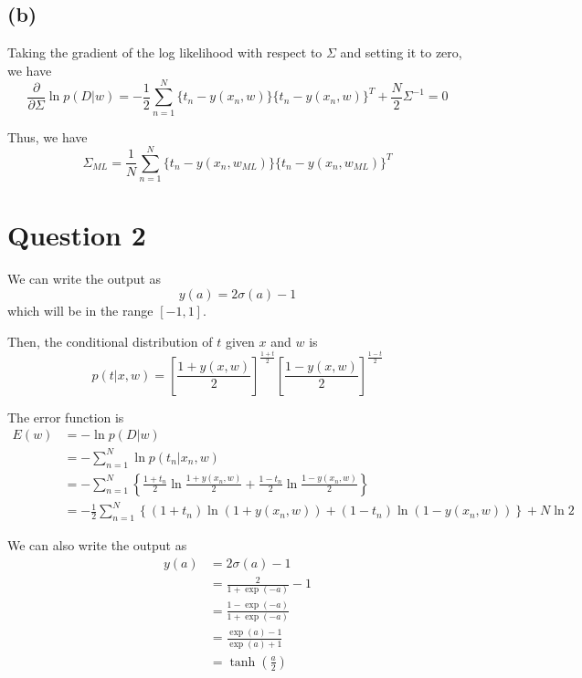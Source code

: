 \documentclass[a4paper,12pt]{article}
\newcommand{\pard}[2]{\frac{\partial #1}{\partial #2}}
\begin{document}
\subsection*{(b)}

Taking the gradient of the log likelihood with respect to $\Sigma$ and setting it to zero, we have
\begin{equation*}
	\pard{}{\Sigma} \ln p(D|w) = -\frac{1}{2} \sum_{n=1}^{N} \{t_n - y(x_n,w)\} \{t_n - y(x_n,w)\}^T + \frac{N}{2} \Sigma^{-1} = 0
\end{equation*}

Thus, we have
\begin{equation*}
	\Sigma_{ML} = \frac{1}{N} \sum_{n=1}^{N} \{t_n - y(x_n,w_{ML})\} \{t_n - y(x_n,w_{ML})\}^T
\end{equation*}

\section*{Question 2}

We can write the output as
\begin{equation*}
	y(a) = 2\sigma(a) - 1
\end{equation*}
which will be in the range $[-1,1]$.

Then, the conditional distribution of $t$ given $x$ and $w$ is
\begin{equation*}
	p(t|x,w) = [\frac{1 + y(x,w)}{2}]^{\frac{1 + t}{2}} [\frac{1 - y(x,w)}{2}]^{\frac{1 - t}{2}}
\end{equation*}

The error function is
\begin{align*}
	E(w) &= -\ln p(D|w) \\
	&= -\sum_{n=1}^{N} \ln p(t_n|x_n,w) \\
	&= -\sum_{n=1}^{N} \left\{ \frac{1 + t_n}{2} \ln \frac{1 + y(x_n,w)}{2} + \frac{1 - t_n}{2} \ln \frac{1 - y(x_n,w)}{2} \right\}\\
	&= - \frac{1}{2} \sum_{n=1}^{N} \left\{ (1 + t_n) \ln (1 + y(x_n,w)) + (1 - t_n) \ln (1 - y(x_n,w)) \right\} + N \ln 2
\end{align*}



We can also write the output as
\begin{align*}
	y(a) &= 2\sigma(a) - 1 \\
	&= \frac{2}{1 + \exp(-a)} - 1 \\
	&= \frac{1 - \exp(-a)}{1 + \exp(-a)} \\
	&= \frac{\exp(a) - 1}{\exp(a) + 1} \\
	&= \tanh(\frac{a}{2})
\end{align*}
\end{document}

